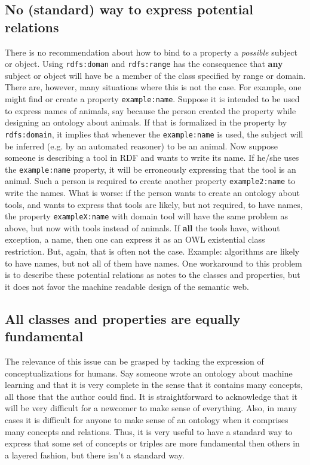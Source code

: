 \documentclass[12pt,fleqn]{article}
\begin{document}
\subsection{No (standard) way to express potential relations}\label{sec:rel}
There is no recommendation about how to bind to a property a \emph{possible}
subject or object.
Using \texttt{rdfs:doman} and \texttt{rdfs:range} has the consequence that
\textbf{any} subject or object will have be a member of the class specified by
range or domain.
There are, however, many situations where this is not the case.
For example, one might find or create a property \texttt{example:name}.
Suppose it is intended to be used to express names of animals,
say because the person created the property while designing an ontology about animals.
If that is formalized in the property by \texttt{rdfs:domain},
it implies that whenever the \texttt{example:name} is used, the subject
will be inferred (e.g. by an automated reasoner) to be an animal.
Now suppose someone is describing a tool in RDF and wants to write its name.
If he/she uses the \texttt{example:name} property, it will be erroneously
expressing that the tool is an animal.
Such a person is required to create another property \texttt{example2:name}
to write the names.
What is worse: if the person wants to create an ontology about tools,
and wants to express that tools are likely, but not required, to have names,
the property \texttt{exampleX:name} with domain tool will have the same problem
as above, but now with tools instead of animals.
If \textbf{all} the tools have, without exception, a name, then one can express
it as an OWL existential class restriction.
But, again, that is often not the case. Example: algorithms are likely to have names,
but not all of them have names.
One workaround to this problem is to describe these potential relations as notes to the
classes and properties, but it does not favor the machine readable design of the semantic web.

\subsection{All classes and properties are equally fundamental}\label{sec:fun}
The relevance of this issue can be grasped by
tacking the expression of conceptualizations for humans.
Say someone wrote an ontology about machine learning and that it is very complete
in the sense that it contains many concepts, all those that the author could find.
It is straightforward to acknowledge that it will be very difficult for a newcomer
to make sense of everything.
Also, in many cases it is difficult for anyone to make sense of an ontology when it
comprises many concepts and relations.
Thus, it is very useful to have a standard way to express that some set of
concepts or triples are more fundamental then others in a layered fashion,
but there isn't a standard way.
\end{document}
